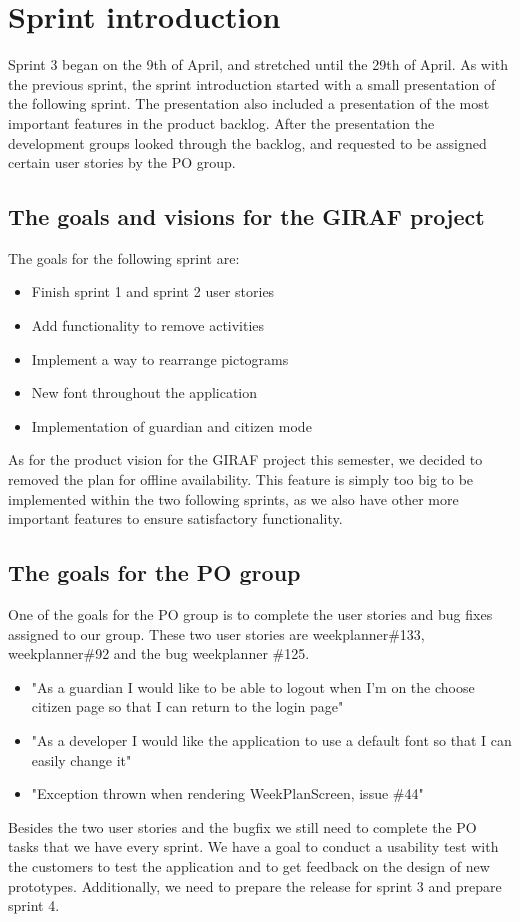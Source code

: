 \section{Sprint introduction}
Sprint 3 began on the 9th of April, and stretched until the 29th of April.
As with the previous sprint, the sprint introduction started with a small presentation of the following sprint. 
The presentation also included a presentation of the most important features in the product backlog.
After the presentation the development groups looked through the backlog, and requested to be assigned certain user stories by the PO group.

\subsection{The goals and visions for the GIRAF project}
The goals for the following sprint are:

\begin{itemize}
    \item Finish sprint 1 and sprint 2 user stories
    \item Add functionality to remove activities
    \item Implement a way to rearrange pictograms
    \item New font throughout the application
    \item Implementation of guardian and citizen mode
\end{itemize}

\noindent
As for the product vision for the GIRAF project this semester, we decided to removed the plan for offline availability. 
This feature is simply too big to be implemented within the two following sprints, as we also have other more important features to ensure satisfactory functionality.

\subsection{The goals for the PO group}
One of the goals for the PO group is to complete the user stories and bug fixes assigned to our group.
These two user stories are weekplanner\#133, weekplanner\#92 and the bug weekplanner \#125.

\begin{itemize}
    \item "As a guardian I would like to be able to logout when I'm on the choose citizen page so that I can return to the login page"
    \item "As a developer I would like the application to use a default font so that I can easily change it"
    \item "Exception thrown when rendering WeekPlanScreen, issue \#44"
\end{itemize}
\noindent
Besides the two user stories and the bugfix we still need to complete the PO tasks that we have every sprint.
We have a goal to conduct a usability test with the customers to test the application and to get feedback on the design of new prototypes.
Additionally, we need to prepare the release for sprint 3 and prepare sprint 4.

